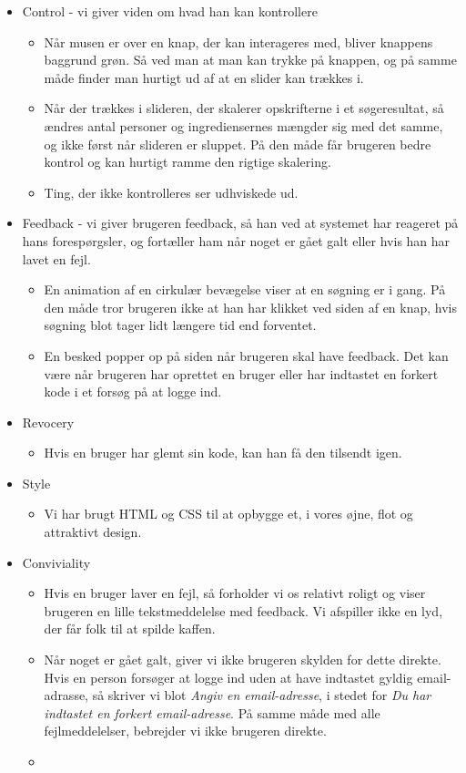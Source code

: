\begin{itemize}
\item Control - vi giver viden om hvad han kan kontrollere
  \begin{itemize}
    \item Når musen er over en knap, der kan interageres med, bliver knappens baggrund grøn. Så ved man at man kan trykke på knappen, og på samme måde finder man hurtigt ud af at en slider kan trækkes i.
    \item Når der trækkes i slideren, der skalerer opskrifterne i et søgeresultat, så ændres antal personer og ingrediensernes mængder sig med det samme, og ikke først når slideren er sluppet. På den måde får brugeren bedre kontrol og kan hurtigt ramme den rigtige skalering.
    \item Ting, der ikke kontrolleres ser udhviskede ud.
  \end{itemize}
  
\item Feedback - vi giver brugeren feedback, så han ved at systemet har reageret på hans forespørgsler, og fortæller ham når noget er gået galt eller hvis han har lavet en fejl.
  \begin{itemize}
  \item En animation af en cirkulær bevægelse viser at en søgning er i gang. På den måde tror brugeren ikke at han har klikket ved siden af en knap, hvis søgning blot tager lidt længere tid end forventet.
  \item En besked popper op på siden når brugeren skal have feedback. Det kan \fx være når brugeren har oprettet en bruger eller har indtastet en forkert kode i et forsøg på at logge ind.
  \end{itemize}

\item Revocery
\begin{itemize}
  \item Hvis en bruger har glemt sin kode, kan han få den tilsendt igen.
\end{itemize}

\item Style
\begin{itemize}
  \item Vi har brugt HTML og CSS til at opbygge et, i vores øjne, flot og attraktivt design.
\end{itemize}

\item Conviviality
\begin{itemize}
  \item Hvis en bruger laver en fejl, så forholder vi os relativt roligt og viser brugeren en lille tekstmeddelelse med feedback. Vi afspiller ikke en lyd, der får folk til at spilde kaffen.
  \item Når noget er gået galt, giver vi ikke brugeren skylden for dette direkte. Hvis en person forsøger at logge ind uden at have indtastet gyldig email-adrasse, så skriver vi blot \textit{Angiv en email-adresse}, i stedet for \textit{Du har indtastet en forkert email-adresse}. På samme måde med alle fejlmeddelelser, bebrejder vi ikke brugeren direkte.
  \item
\end{itemize}

\end{itemize}